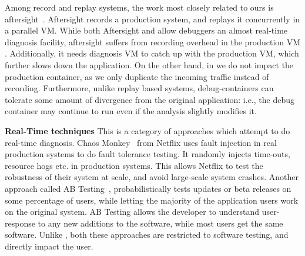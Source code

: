 Among record and replay systems, the work most closely related to ours is aftersight~\cite{aftersight}. 
Aftersight records a production system, and replays it concurrently in a parallel VM.
While both Aftersight and \parikshan allow debuggers an almost real-time diagnosis facility, aftersight suffers from recording overhead in the production VM .
Additionally, it needs diagnosis VM to catch up with the production VM, which further slows down the application.
On the other hand, in \parikshan we do not impact the production container, as we only duplicate the incoming traffic instead of recording.
Furthermore, unlike replay based systems, \parikshan debug-containers can tolerate some amount of divergence from the original application: i.e., the debug container may continue to run even if the analysis slightly modifies it.
  
\iffalse
\textbf{Distributed System Debugging}
Production systems oftem employ light weight instrumentation tools~\cite{magpie,clue,vpath} to capture traces like system calls, transaction or event traces.
Some of these like VPath~\cite{vpath} use end-to-end trace event stitching to capture flows across multiple tiers to infer performance bugs.
While the instrumentation for these tools have a low overhead, the corresponding granularity of the logs is also less.
This limits the diagnosis capability of these tools, and they are only able to give a hint towards the bug root-cause rather than debug it completely.
\fi

\textbf{Real-Time techniques}
This is a category of approaches which attempt to do real-time diagnosis.
Chaos Monkey~\cite{chaosmonkey} from Netflix uses fault injection in real production systems to do fault tolerance testing.
It randomly injects time-outs, resource hogs etc. in production systems. 
This allows Netflix to test the robustness of their system at scale, and avoid large-scale system crashes.  
Another approach called AB Testing~\cite{abtesting}, probabilistically tests updates or beta releases on some percentage of users, 
while letting the majority of the application users work on the original system.
AB Testing allows the developer to understand user-response to any new additions to the software, while most users get the same software.
Unlike \parikshan, both these approaches are restricted to software testing, and directly impact the user.


